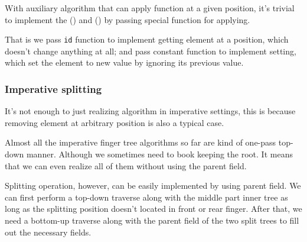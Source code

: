 \documentclass[UTF8]{article}
\begin{document}
With auxiliary algorithm that can apply function at a given position, it's trivial to implement
the () and () by passing special function for applying.

\begin{algorithmic}
  \State \Return {}
\EndFunction
\Statex
{}
  \State \Return {}
\EndFunction
\end{algorithmic}

That is we pass \verb|id| function to implement getting element at a position, which doesn't
change anything at all; and pass constant function to implement setting, which set the element
to new value by ignoring its previous value.

\subsubsection{Imperative splitting}

It's not enough to just realizing  algorithm in imperative settings, this
is because removing element at arbitrary position is also a typical case.

Almost all the imperative finger tree algorithms so far are kind of one-pass top-down manner.
Although we sometimes need to book keeping the root. It means that we can even realize all
of them without using the parent field.

Splitting operation, however, can be easily implemented by using parent field. We can first
perform a top-down traverse along with the middle part inner tree as long as the splitting position
doesn't located in front or rear finger. After that, we need a bottom-up traverse along
with the parent field of the two split trees to fill out the necessary fields.
\end{document}
